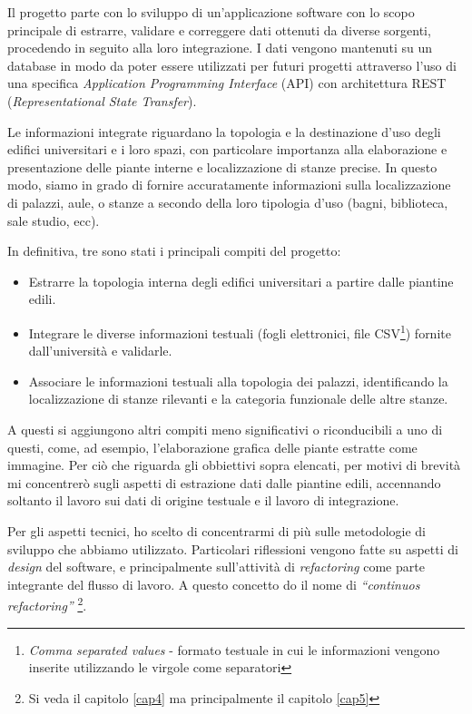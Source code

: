 \documentclass[12pt]{report}
\begin{document}
Il progetto parte con lo sviluppo di un'applicazione software con 
lo scopo principale di estrarre, validare e correggere dati 
ottenuti da diverse sorgenti, procedendo in seguito alla loro integrazione.
I dati vengono mantenuti su un database in modo da poter essere 
utilizzati per futuri progetti attraverso l'uso di una specifica 
\textit{Application Programming Interface} (API) con architettura REST 
(\textit{Representational State Transfer}). 

Le informazioni integrate riguardano la topologia e la destinazione
d'uso degli edifici universitari e i loro spazi, con particolare
importanza alla elaborazione e presentazione delle piante interne e
localizzazione di stanze precise. In questo modo, siamo in grado di
fornire accuratamente informazioni sulla localizzazione di palazzi,
aule, o stanze a secondo della loro tipologia d'uso (bagni, 
biblioteca, sale studio, ecc).

In definitiva, tre sono stati i principali compiti del progetto:
\begin{itemize}
  \item Estrarre la topologia interna degli edifici universitari a
partire dalle piantine edili.
  \item Integrare le diverse informazioni testuali (fogli elettronici,
file CSV\footnote{\textit{Comma separated values} - formato testuale
in cui le informazioni vengono inserite utilizzando le virgole come
separatori}) fornite dall'università e validarle.
  \item Associare le informazioni testuali alla topologia dei palazzi,
identificando la localizzazione di stanze rilevanti e la categoria
funzionale delle altre stanze.
\end{itemize}

A questi si aggiungono altri compiti meno significativi o riconducibili a uno
di questi, come, ad esempio, l'elaborazione grafica delle piante estratte
come immagine. Per ciò che riguarda gli obbiettivi sopra elencati, per 
motivi di brevità mi concentrerò sugli aspetti di estrazione dati
dalle piantine edili, accennando soltanto il lavoro sui dati di origine
testuale e il lavoro di integrazione.

Per gli aspetti tecnici, ho scelto di concentrarmi di più sulle
metodologie di sviluppo che abbiamo utilizzato. 
Particolari riflessioni vengono fatte su
aspetti di \textit{design} del software, e principalmente sull'attività
di \textit{refactoring} come parte integrante del flusso di lavoro.
A questo concetto do il nome di \textit{“continuos refactoring”} 
\footnote{Si veda il capitolo \ref{cap4} ma principalmente il capitolo \ref{cap5}}.
\end{document}

